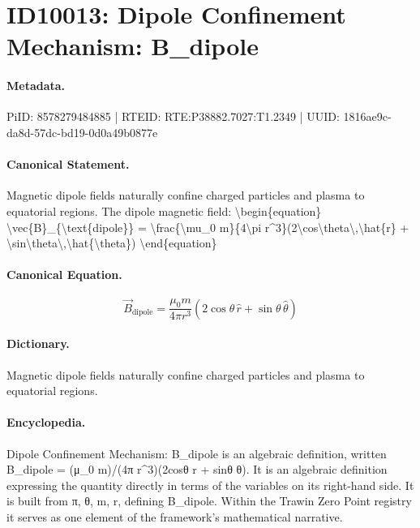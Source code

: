 \section*{ID10013: Dipole Confinement Mechanism: B\_dipole}
\paragraph{Metadata.}
PiID: 8578279484885 | RTEID: RTE:P38882.7027:T1.2349 | UUID: 1816ae9c-da8d-57dc-bd19-0d0a49b0877e

\paragraph{Canonical Statement.}
Magnetic dipole fields naturally confine charged particles and plasma to equatorial regions. The dipole magnetic field: \textbackslash{}begin\{equation\} \textbackslash{}vec\{B\}\_\{\textbackslash{}text\{dipole\}\} = \textbackslash{}frac\{\textbackslash{}mu\_0 m\}\{4\textbackslash{}pi r\textasciicircum{}3\}(2\textbackslash{}cos\textbackslash{}theta\textbackslash{},\textbackslash{}hat\{r\} + \textbackslash{}sin\textbackslash{}theta\textbackslash{},\textbackslash{}hat\{\textbackslash{}theta\}) \textbackslash{}end\{equation\}

\paragraph{Canonical Equation.}
\[
\vec{B}_{\text{dipole}} = \frac{\mu_0 m}{4\pi r^3}(2\cos\theta\,\hat{r} + \sin\theta\,\hat{\theta})
\]

\paragraph{Dictionary.}
Magnetic dipole fields naturally confine charged particles and plasma to equatorial regions.

\paragraph{Encyclopedia.}
Dipole Confinement Mechanism: B\_dipole is an algebraic definition, written B\_dipole = (μ\_0 m)/(4π r\textasciicircum{}3)(2cosθ r + sinθ θ). It is an algebraic definition expressing the quantity directly in terms of the variables on its right-hand side. It is built from π, θ, m, r, defining B\_dipole. Within the Trawin Zero Point registry it serves as one element of the framework's mathematical narrative.

